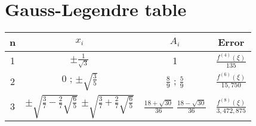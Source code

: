 \documentclass{llncs}
\begin{document}
\newpage
\appendix

\section{Gauss-Legendre table}
\label{app:gl}
\begin{tabular}{c|c|c|c}
n & $x_i$                                                                                                          & $A_i$                                                & Error                             \\ 
\hline                                                                                                                                                                                                         
1 & $\pm\frac{1}{\sqrt{3}}$                                                                                        & 1                                                    & $\frac{f^{(4)}(\xi)}{135}$        \\
2 & 0 ; $\pm \sqrt{\frac{3}{5}}$                                                                                   & $\frac{8}{9}$ ; $\frac{5}{9}$                        & $\frac{f^{(6)}(\xi)}{15,750}$     \\
3 & \parbox{5cm}{$\pm \sqrt{\frac{3}{7}-\frac{2}{7}\sqrt{\frac{6}{5}}}$ \\  $\pm \sqrt{\frac{3}{7}+\frac{2}{7}\sqrt{\frac{6}{5}}}$} & \parbox{5cm}{$\frac{18+\sqrt{30}}{36}$ \\ $\frac{18-\sqrt{30}}{36}$} & $\frac{f^{(8)}(\xi)}{3,472,875}$  \\
\end{tabular}
\end{document}
